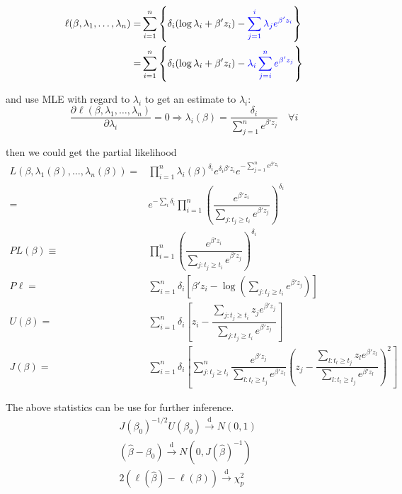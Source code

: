 \begin{align}
    \ell(\beta ,\lambda _1,\ldots,\lambda _n)=&\sum_{i=1}^n\left\{ \delta _i(\log\lambda _i+\beta 'z_i)-{\color{blue}\sum_{j=1}^i\lambda _je^{\beta 'z_i}} \right\}\\
    =&\sum_{i=1}^n\left\{ \delta _i(\log\lambda _i+\beta 'z_i)-{\color{blue}\lambda _i\sum_{j=i}^ne^{\beta 'z_j}} \right\}
\end{align}

and use MLE with regard to $ \lambda _i $ to get an estimate to $ \lambda _i $: 
\begin{equation}
    \dfrac{\partial^{} \ell(\beta ,\lambda _1,\ldots,\lambda _n)}{\partial \lambda _i^{}}=0\Rightarrow \lambda _i(\beta )=\dfrac{\delta _i}{\sum_{j=1}^ne^{\beta 'z_j}} \quad \forall i
\end{equation}

then we could get the partial likelihood
\begin{align}
    L(\beta ,\lambda _1(\beta ),\ldots,\lambda _n(\beta ))=&\prod_{i=1}^n\lambda _i(\beta )^{\delta _i}e^{\delta _i\beta 'z_i}e^{-\sum_{j=1}^ne^{\beta 'z_i}}\\
    =&e^{-\sum_i\delta _i}\prod_{i=1}^n\left( \dfrac{e^{\beta 'z_i}}{\sum_{j:t_j\geq t_i}e^{\beta 'z_j}} \right)^{\delta _i}\\
    PL(\beta )\equiv&\prod_{i=1}^n\left( \dfrac{e^{\beta 'z_i}}{\sum_{j:t_j\geq t_i}e^{\beta 'z_j}} \right)^{\delta_i}\\
    P\ell=&\sum_{i=1}^n\delta _i\left[ \beta 'z_i-\log\left(\sum_{j:t_j\geq t_i}e^{\beta 'z_j}\right) \right]\\
    U(\beta )=&\sum_{i=1}^n\delta _i\left[ z_i-\dfrac{\sum_{j:t_j\geq t_i}z_je^{\beta 'z_j}}{\sum_{j:t_j\geq t_i}e^{\beta 'z_j}} \right]\\
    J(\beta )=&\sum_{i=1}^n\delta _i\left[ \sum_{j:t_j\geq t_i}^n \dfrac{e^{\beta 'z_j}}{\sum_{l:t_l\geq t_j}e^{\beta 'z_l}} \left( z_j-\dfrac{\sum_{l:t_l\geq t_j}z_le^{\beta 'z_l}}{\sum_{l:t_l\geq t_j}e^{\beta 'z_l}} \right)^2 \right]
\end{align}

The above statistics can be use for further inference.
\begin{align}
    &J(\beta _0)^{-1/2}U(\beta _0)\xrightarrow[]{\mathrm{d}} N(0,1)\\
    &(\hat{\beta }-\beta _0)\xrightarrow[]{\mathrm{d}} N(0,J(\hat{\beta })^{-1})\\
    &2(\ell(\hat{\beta })-\ell(\beta))\xrightarrow[]{\mathrm{d}} \chi^2_p
\end{align}

